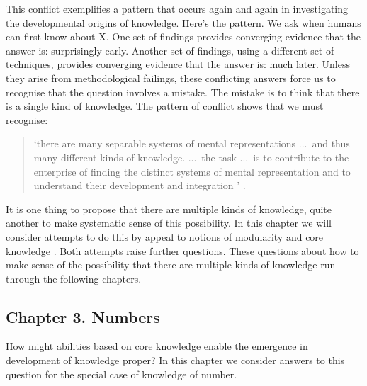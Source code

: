 \documentclass[12pt,\papersize]{extarticle}
\begin{document}
This conflict exemplifies a pattern that occurs again and again in investigating the developmental origins of knowledge. 
Here's the pattern.
We ask when humans can first know about X. 
One set of findings provides converging evidence that the answer is: surprisingly early.
Another set of findings, using a different set of techniques,  provides converging evidence that the answer is: much later. 
Unless they arise from methodological failings, these conflicting answers force us to recognise that the question involves a mistake. 
The mistake is to think that there is a single kind of knowledge. 
The pattern of conflict shows that we must recognise:
%
\begin{quote}
`there are many separable systems of mental representations ...\ and thus many different kinds of knowledge. ...\ the task ...\ is to contribute to the enterprise of finding the distinct systems of mental representation and to understand their development and integration%
'
\citep[p.\ 1522]{Hood:2000bf}.
\end{quote}
%
It is one thing to propose that there are multiple kinds of knowledge, quite another to make systematic sense of this possibility.
In this chapter we will consider attempts to do this by appeal to notions of modularity \citep{Fodor:1983dg}
and core knowledge \citep{Spelke:2007hb}. 
Both attempts raise further questions.  
These questions about how to make sense of the possibility that there are multiple kinds of knowledge 
run through the following chapters. 



\subsection{Chapter 3. Numbers}

How might abilities based on core knowledge enable the emergence in development of knowledge proper? 
In this chapter we consider answers to this question for the special case of knowledge of number.
\end{document}
